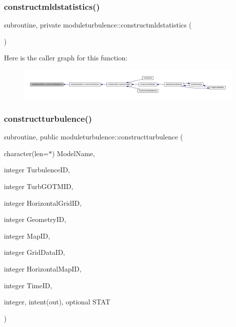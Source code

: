 \subsubsection{\texorpdfstring{constructmldstatistics()}{constructmldstatistics()}}
{\footnotesize\ttfamily subroutine, private moduleturbulence\+::constructmldstatistics (\begin{DoxyParamCaption}{ }\end{DoxyParamCaption})\hspace{0.3cm}{\ttfamily [private]}}

Here is the caller graph for this function\+:\nopagebreak
\begin{figure}[H]
\begin{center}
\leavevmode
\includegraphics[width=350pt]{namespacemoduleturbulence_a5e493c3242c2ad7a0f5df2178a37aa3b_icgraph}
\end{center}
\end{figure}
\mbox{\label{namespacemoduleturbulence_ace39b4cf089aa70cd60b083a3e341bc9}} 
\subsubsection{\texorpdfstring{constructturbulence()}{constructturbulence()}}
{\footnotesize\ttfamily subroutine, public moduleturbulence\+::constructturbulence (\begin{DoxyParamCaption}\item[{character(len=$\ast$)}]{Model\+Name,  }\item[{integer}]{Turbulence\+ID,  }\item[{integer}]{Turb\+G\+O\+T\+M\+ID,  }\item[{integer}]{Horizontal\+Grid\+ID,  }\item[{integer}]{Geometry\+ID,  }\item[{integer}]{Map\+ID,  }\item[{integer}]{Grid\+Data\+ID,  }\item[{integer}]{Horizontal\+Map\+ID,  }\item[{integer}]{Time\+ID,  }\item[{integer, intent(out), optional}]{S\+T\+AT }\end{DoxyParamCaption})}

